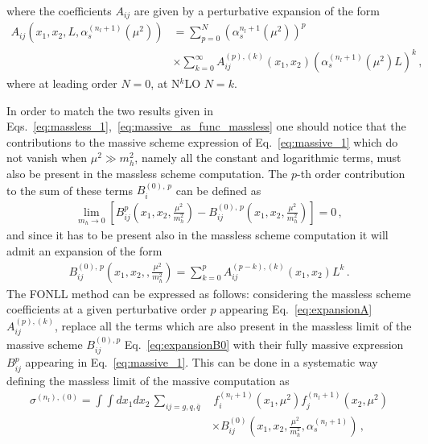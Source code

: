 where the coefficients $A_{ij}$ are given by a perturbative expansion of the form
\begin{align}
    \label{eq:expansionA}
    A_{ij}\left(x_1,x_2,L,\alpha_s^{(n_l+1)}\left(\mu^2\right)\right)&
    = \sum_{p=0}^N \left(\alpha_s^{n_l+1}\left(\mu^2\right)\right)^p \nonumber\\
    &\times\sum_{k=0}^{\infty} A_{ij}^{(p),(k)}\left(x_1,x_2\right)\left(\alpha_s^{(n_l+1)}\left(\mu^2\right)L\right)^k\,,
\end{align}
where at leading order $N=0$, at N$^k$LO $N=k$.

In order to match the two results given in Eqs.~\eqref{eq:massless_1},~\eqref{eq:massive_as_func_massless} 
one should notice that the contributions to the massive scheme expression of Eq.~\eqref{eq:massive_1}
which do not vanish when $\mu^2 \gg m_h^2$, namely all the constant and logarithmic terms, 
must also be present in the massless scheme computation.
The $p$-th order contribution to the sum of these terms $B_i^{(0),\,p}$ can be defined as
\begin{align}
    \lim_{m_h\rightarrow 0}\left[B_{ij}^p\left(x_1,x_2,\frac{\mu^2}{m_h^2}\right)- 
    B_{ij}^{(0),\,p}\left(x_1,x_2,\frac{\mu^2}{m_h^2}\right)\right] = 0\,,
\end{align}
and since it has to be present also in the massless scheme computation it will admit an expansion of the form
\begin{align}
    \label{eq:expansionB0}
    B_{ij}^{(0),\,p}\left(x_1,x_2,,\frac{\mu^2}{m_h^2}\right) = \sum_{k=0}^p  A_{ij}^{(p-k),(k)}\left(x_1,x_2\right)L^k\,.
\end{align}
The FONLL method can be expressed as follows: considering the massless scheme coefficients
at a given perturbative order $p$  
appearing Eq.~\eqref{eq:expansionA} $A^{(p),(k)}_{ij}$, replace all the terms which are also present in the massless limit of the massive scheme
$B^{(0),p}_{ij}$ Eq.~\eqref{eq:expansionB0} with their fully massive expression $B^{p}_{ij}$ appearing in Eq.~\eqref{eq:massive_1}.
This can be done in a systematic way defining the massless limit of the massive computation as
\begin{align}
    \label{eq:massive_massless_limit}
    \sigma^{(n_l),(0)} = \int \int dx_1 dx_2\, \sum_{ij = g,q,\bar{q} }&\, 
    f_i^{(n_l+1)}\left(x_1,\mu^2\right)f_j^{(n_l+1)}\left(x_2,\mu^2\right) \nonumber \\
    &\times B^{(0)}_{ij}\left(x_1,x_2,\frac{\mu^2}{m_h^2},\alpha_s^{(n_l+1)}\right)\,,
\end{align}
